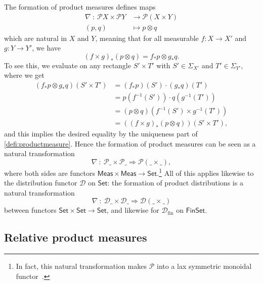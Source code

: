 \documentclass[11pt,a4paper]{scrartcl}
\newcommand{\setc}{\mathsf{Set}}
\newcommand{\finset}{\mathsf{FinSet}}
\newcommand{\meas}{\mathsf{Meas}}
\newcommand{\dist}{\mathcal{D}}
\newcommand{\distfin}{\mathcal{D}_{\mathrm{fin}}}
\newcommand{\giry}{\mathcal{P}}
\theoremstyle{definition}
\begin{document}
The formation of product measures defines maps
\begin{align*}
	\nabla \: : \: \giry X \times \giry Y & \longrightarrow \giry(X \times Y) \\
	(p,q) & \longmapsto p \otimes q
\end{align*}
which are natural in $X$ and $Y$, meaning that for all measurable $f : X \to X'$ and $g : Y \to Y'$, we have
\[
	(f \times g)_\ast (p \otimes q) = f_\ast p \otimes g_\ast q.
\]
To see this, we evaluate on any rectangle $S' \times T'$ with $S' \in \Sigma_{X'}$ and $T' \in \Sigma_{Y'}$, where we get
\begin{align*}
	(f_\ast p \otimes g_* q)(S' \times T') & = (f_\ast p)(S') \cdot (g_\ast q)(T') \\[2pt]
						& = p(f^{-1}(S')) \cdot q(g^{-1}(T')) \\[2pt]
						& = (p \otimes q)(f^{-1}(S') \times g^{-1}(T')) \\[2pt]
						& = ((f \times g)_\ast (p \otimes q))(S' \times T'),
\end{align*}
and this implies the desired equality by the uniqueness part of \cref{defi:productmeasure}.
Hence the formation of product measures can be seen as a natural transformation
\begin{equation}
	\label{eq:productnaturality_giry}
	\nabla \: : \: \giry\_ \times \giry\_ \Longrightarrow \giry(\_ \times \_),
\end{equation}
where both sides are functors $\meas \times \meas \longrightarrow \setc$.\footnote{In fact, this natural transformation makes $\giry$ into a lax symmetric monoidal functor~\cite{Fritz2018}.}
All of this applies likewise to the distribution functor $\dist$ on $\setc$: the formation of product distributions is a natural transformation
\begin{equation}
	\label{eq:productnaturality_dist}
	\nabla \: : \: \dist\_ \times \dist\_ \Longrightarrow \dist(\_ \times \_)
\end{equation}
between functors $\setc \times \setc \longrightarrow \setc$, and likewise for $\distfin$ on $\finset$.

\subsection{Relative product measures}
\end{document}

